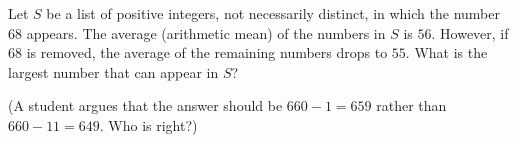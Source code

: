 Let $S$ be a list of positive integers, not necessarily distinct, in which the number $68$ appears. The average (arithmetic mean) of the numbers in $S$ is $56$. However, if $68$ is removed, the average of the remaining numbers drops to $55$. What is the largest number that can appear in $S$?

(A student argues that the answer should be $660-1=659$ rather than $660-11=649$. Who is right?)
